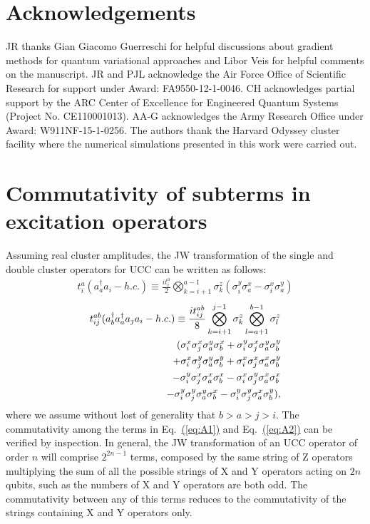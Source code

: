 \documentclass[superscriptaddress,aps,pra,twocolumn,nofootinbib,babel]{revtex4-1}
\newcommand{\eq}[1]{Eq.~\hyperref[eq:#1]{(\ref*{eq:#1})}}
\begin{document}
\section*{Acknowledgements}

JR thanks Gian Giacomo Guerreschi for helpful discussions about gradient methods for quantum variational approaches and Libor Veis for helpful comments on the manuscript. JR and PJL acknowledge the Air Force Office of Scientific Research for support under Award: FA9550-12-1-0046. CH acknowledges partial support by the ARC Center of Excellence for Engineered Quantum Systems (Project No. CE110001013). AA-G acknowledges the Army Research Office under Award: W911NF-15-1-0256. The authors thank the Harvard Odyssey cluster facility where the numerical simulations presented in this work were carried out.

\appendix

\section{Commutativity of subterms in excitation operators}\label{app:appendixA}

Assuming real cluster amplitudes, the JW transformation of the single and double cluster operators for UCC can be written as follows:
\begin{align}\label{eq:A1}
t^{a}_{i}(a_a^{\dagger}a_i- h.c.) \equiv \frac{it^{a}_{i}}{2} \bigotimes^{a-1}_{k=i+1}  \sigma^{z}_k (\sigma^{y}_i\sigma^{x}_a-\sigma^{x}_i\sigma^{y}_a)
\end{align}
\begin{align}\label{eq:A2}
t^{ab}_{ij}(a_b^{\dagger} a_a^{\dagger}  a_j a_i - h.c.) \equiv \frac{it^{ab}_{ij}}{8} \bigotimes^{j-1}_{k=i+1} \sigma^{z}_k \bigotimes^{b-1}_{l=a+1} \sigma^{z}_l \notag \\ 
( \sigma^{x}_i \sigma^{x}_j \sigma^{y}_a \sigma^{x}_b +
\sigma^{y}_i \sigma^{x}_j \sigma^{y}_a \sigma^{y}_b \notag \\
+ \sigma^{x}_i \sigma^{y}_j \sigma^{y}_a \sigma^{y}_b 
+ \sigma^{x}_i \sigma^{x}_j \sigma^{x}_a \sigma^{y}_b \notag \\
- \sigma^{y}_i \sigma^{x}_j \sigma^{x}_a \sigma^{x}_b 
- \sigma^{x}_i \sigma^{y}_j \sigma^{x}_a \sigma^{x}_b \notag \\
- \sigma^{y}_i \sigma^{y}_j \sigma^{y}_a \sigma^{x}_b 
- \sigma^{y}_i \sigma^{y}_j \sigma^{x}_a \sigma^{y}_b),
\end{align}
where we assume without lost of generality that $b>a>j>i$. The commutativity among the terms in \eq{A1} and \eq{A2} can be verified by inspection. In general, the JW transformation of an UCC operator of order $n$ will comprise $2^{2n-1}$ terms, composed by the same string of Z operators multiplying the sum of all the possible strings of X and Y operators acting on $2n$ qubits, such as the numbers of X and Y operators are both odd. The commutativity between any of this terms reduces to the commutativity of the strings containing X and Y operators only.
\end{document}
